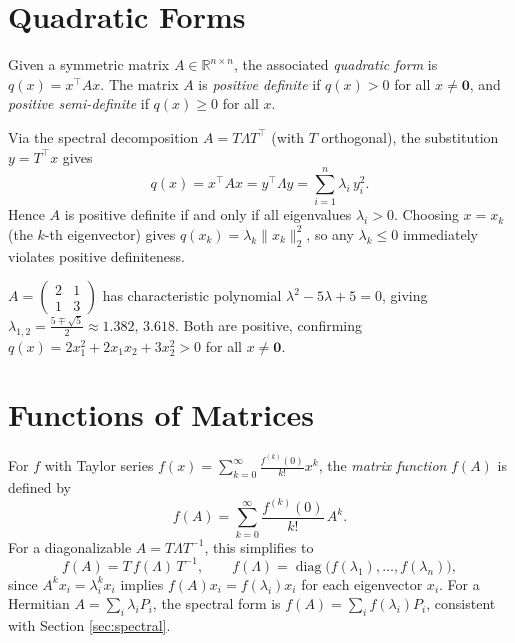 \section{Quadratic Forms}

Given a symmetric matrix $A\in\mathbb{R}^{n\times n}$, the associated \emph{quadratic form} is $q(x) = x^\top Ax$. The matrix $A$ is \emph{positive definite} if $q(x)>0$ for all $x\neq\mathbf{0}$, and \emph{positive semi-definite} if $q(x)\ge0$ for all $x$.

Via the spectral decomposition $A=T\Lambda T^\top$ (with $T$ orthogonal), the substitution $y=T^\top x$ gives
\[
  q(x) = x^\top Ax = y^\top\Lambda y = \sum_{i=1}^n \lambda_i\,y_i^2.
\]
Hence $A$ is positive definite if and only if all eigenvalues $\lambda_i>0$. Choosing $x=x_k$ (the $k$-th eigenvector) gives $q(x_k)=\lambda_k\|x_k\|_2^2$, so any $\lambda_k\le0$ immediately violates positive definiteness.

\begin{example}
$A=\begin{pmatrix}2&1\\1&3\end{pmatrix}$ has characteristic polynomial $\lambda^2-5\lambda+5=0$, giving $\lambda_{1,2}=\frac{5\mp\sqrt{5}}{2}\approx1.382,\,3.618$. Both are positive, confirming $q(x)=2x_1^2+2x_1x_2+3x_2^2>0$ for all $x\neq\mathbf{0}$.
\end{example}

\section{Functions of Matrices}
\label{sec:matrix-functions}

For $f$ with Taylor series $f(x)=\sum_{k=0}^\infty \frac{f^{(k)}(0)}{k!}x^k$, the \emph{matrix function} $f(A)$ is defined by
\[
  f(A) = \sum_{k=0}^\infty \frac{f^{(k)}(0)}{k!}\,A^k.
\]
For a diagonalizable $A=T\Lambda T^{-1}$, this simplifies to
\[
  f(A) = T\,f(\Lambda)\,T^{-1}, \qquad
  f(\Lambda) = \operatorname{diag}\!\bigl(f(\lambda_1),\ldots,f(\lambda_n)\bigr),
\]
since $A^k x_i=\lambda_i^k x_i$ implies $f(A)x_i=f(\lambda_i)x_i$ for each eigenvector $x_i$. For a Hermitian $A=\sum_i\lambda_i P_i$, the spectral form is $f(A)=\sum_i f(\lambda_i)P_i$, consistent with Section \ref{sec:spectral}.

